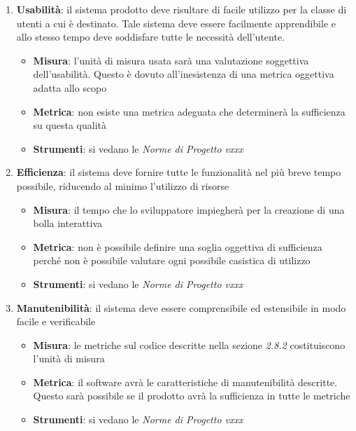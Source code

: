{\begin{enumerate}
  \item \textbf{Usabilità}: il sistema prodotto deve risultare di facile
  utilizzo per la classe di utenti a cui è destinato. Tale sistema
  deve essere facilmente apprendibile e allo stesso tempo deve
  soddisfare tutte le necessità dell’utente. 
  \begin{itemize}
    \item \textbf{Misura}: l’unità di misura usata sarà una valutazione soggettiva dell’usabilità. Questo è dovuto all’inesistenza di una metrica oggettiva adatta allo scopo
    \item \textbf{Metrica}:  non esiste una metrica adeguata che determinerà la sufficienza su questa qualità
    \item \textbf{Strumenti}: si vedano le  \emph{Norme di Progetto vxxx} 
  \end{itemize}
  
  \item \textbf{Efficienza}: il sistema deve fornire tutte le funzionalità nel più breve tempo possibile,
  riducendo al minimo l’utilizzo di risorse
  \begin{itemize}
    \item \textbf{Misura}: il tempo che lo sviluppatore impiegherà per la creazione di una bolla interattiva
    \item \textbf{Metrica}: non è possibile definire una soglia oggettiva di sufficienza perché non è possibile valutare ogni possibile casistica di utilizzo
    \item \textbf{Strumenti}: si vedano le  \emph{Norme di Progetto vxxx} 
  \end{itemize}
  
  \item \textbf{Manutenibilità}: il sistema deve essere comprensibile ed estensibile in modo facile e verificabile
  \begin{itemize}
    \item \textbf{Misura}: le metriche sul codice descritte nella sezione \emph{2.8.2}
    costituiscono l'unità di misura
    \item \textbf{Metrica}: il software avrà le caratteristiche di manutenibilità descritte. Questo sarà possibile se il prodotto avrà la sufficienza in tutte le metriche
    \item \textbf{Strumenti}: si vedano le  \emph{Norme di Progetto vxxx} 
  \end{itemize}
  

\end{enumerate}}
